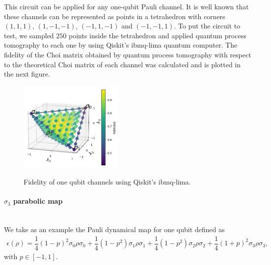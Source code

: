 This circuit can be applied for any one-qubit Pauli channel. It is well known that these channels can be represented as points in a tetrahedron with corners $(1,1,1)$, $(1,-1,-1)$, $(-1,1,-1)$ and $(-1,-1,1)$. To put the circuit to test, we sampled $250$ points inside the tetrahedron and applied quantum process tomography to each one by using Qiskit's ibmq-lima quantum computer. The fidelity of the Choi matrix obtained by quantum process tomography with respect to the theoretical Choi matrix of each channel was calculated and is plotted in the next figure. 



\begin{figure}[h!]
\centering
\includegraphics[width=0.45\textwidth]{fidelidad-puntos.png}\\
\caption{Fidelity of one qubit channels using Qiskit's ibmq-lima.}
\end{figure}


\paragraph{$\sigma_3$ parabolic map} $\;$ \\

We take as an example the Pauli dynamical map for one qubit defined as
\begin{eqnarray}
\epsilon(\rho) = \dfrac{1}{4} (1-p)^2 \sigma_0 \rho \sigma_0 + \dfrac{1}{4} (1-p^2) \sigma_1 \rho \sigma_1 + \dfrac{1}{4} (1-p^2) \sigma_2 \rho \sigma_2 + \dfrac{1}{4} (1+p)^2 \sigma_3 \rho \sigma_3 ,
\end{eqnarray}
with $p \in [-1,1]$. \\

